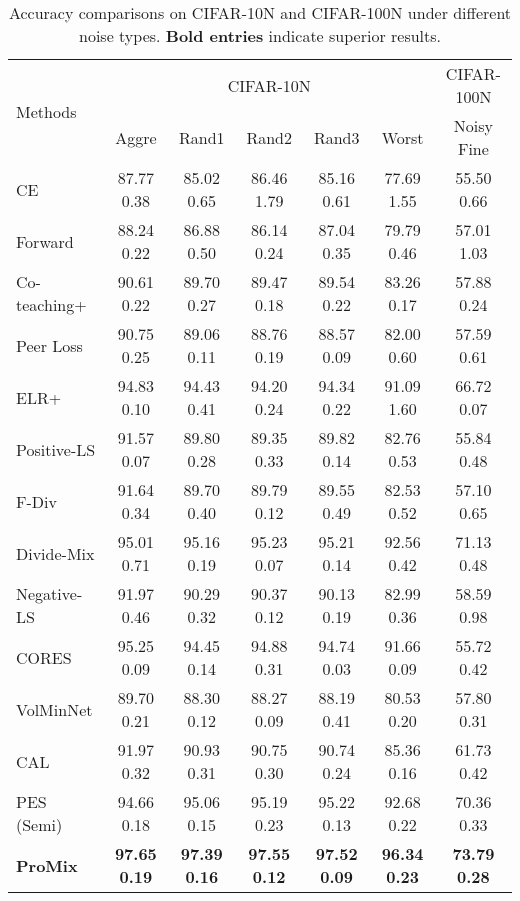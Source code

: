 \documentclass{article}
\begin{document}
\begin{table*}[!t]
    \centering
    \small
\tabcolsep=0.4cm
    \begin{tabular}{l|ccccc|c}
        \toprule
        \multirow{2}{*}{Methods}  & \multicolumn{5}{c|}{CIFAR-10N} &
        \multicolumn{1}{c}{CIFAR-100N} \\
        \cmidrule{2-7}
		 & Aggre & Rand1 & Rand2& Rand3 & Worst & Noisy Fine\\
        \midrule
			     CE   & 87.77  0.38 &  85.02  0.65& 86.46  1.79  & 85.16  0.61 & 77.69  1.55 & 55.50  0.66\\
				 Forward    & 88.24  0.22 & 86.88  0.50 & 86.14  0.24 & 87.04  0.35 &  79.79  0.46  & 57.01  1.03\\
				 Co-teaching+  & 90.61  0.22 & 89.70  0.27 & 89.47  0.18 & 89.54  0.22 & 83.26  0.17 & 57.88  0.24\\
				Peer Loss   & 90.75  0.25 & 89.06  0.11 & 88.76  0.19 & 88.57  0.09 & 82.00  0.60 &  57.59  0.61\\
			ELR+   & 94.83  0.10 & 94.43  0.41 & 94.20  0.24 & 94.34  0.22 & 91.09  1.60  & 66.72  0.07 \\	
   Positive-LS  & 91.57  0.07 & 89.80  0.28 & 89.35  0.33 & 89.82  0.14 & 82.76  0.53  & 55.84  0.48\\
				F-Div   & 91.64  0.34 & 89.70  0.40 & 89.79  0.12 & 89.55  0.49 & 82.53  0.52 & 57.10  0.65\\
				Divide-Mix   & 95.01  0.71  & 95.16  0.19 & 95.23  0.07  & 95.21  0.14  & 92.56  0.42  & 71.13  0.48\\
				Negative-LS   & 91.97  0.46 & 90.29  0.32 & 90.37  0.12 & 90.13  0.19 & 82.99  0.36 &  58.59  0.98\\
				 CORES    &  95.25  0.09 & 94.45  0.14  &   94.88  0.31& 94.74  0.03 & 91.66  0.09 &  55.72  0.42\\
				  VolMinNet    & 89.70  0.21  & 88.30  0.12 & 88.27  0.09  & 88.19  0.41 & 80.53  0.20  & 57.80  0.31\\
				CAL   & 91.97  0.32 & 90.93  0.31 & 90.75  0.30 & 90.74  0.24 & 85.36  0.16 &  61.73  0.42\\
					PES (Semi)  &  94.66  0.18    & 95.06  0.15 & 95.19  0.23 &  95.22  0.13 & 92.68  0.22  &  70.36  0.33 \\ \midrule
        \textbf{ProMix}    & \textbf{97.65  0.19}	  & \textbf{97.39  0.16 } & \textbf{97.55  0.12 }  & \textbf{97.52  0.09}  & \textbf{96.34  0.23}   &\textbf{73.79  0.28}\\
        \bottomrule
    \end{tabular}
    \caption{Accuracy comparisons on CIFAR-10N and CIFAR-100N under different noise types. \textbf{Bold entries} indicate superior results. }
    \label{tab:cifarn_all}
\end{table*}
\end{document}
